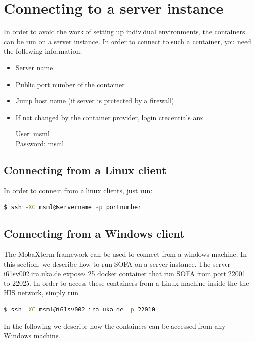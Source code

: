 \section{Connecting to a server instance}  
 
In order to avoid the work of setting up individual environments, the containers can be run on a server instance. In order to connect to such a container, you need the following information:
\begin{itemize}
	\item Server name
	\item Public port number of the container
	\item Jump host name (if server is protected by a firewall)
	\item If not changed by the container provider, login credentials are: 
	
	\begin{description}
		\item[User: msml] 
		\item[Password: msml] 
	\end{description}
	
\end{itemize}

\subsection{Connecting from a Linux client}

In order to connect from a linux clients, just run:
	\begin{lstlisting}[language=sh]
  $ ssh -XC msml@servername -p portnumber
\end{lstlisting}

\subsection{Connecting from a Windows client}

The MobaXterm framework can be used to connect from a windows machine.
 In this section, we describe how to run SOFA on a server instance. The server i61sv002.ira.uka.de exposes 25 docker container that run SOFA from port 22001 to 22025. In order to access these containers from a Linux machine inside the the HIS network, simply run
	\begin{lstlisting}[language=sh, breaklines=true]
  $ ssh -XC msml@i61sv002.ira.uka.de -p 22010
\end{lstlisting}

In the following we describe how the containers can be accessed from any Windows machine.

